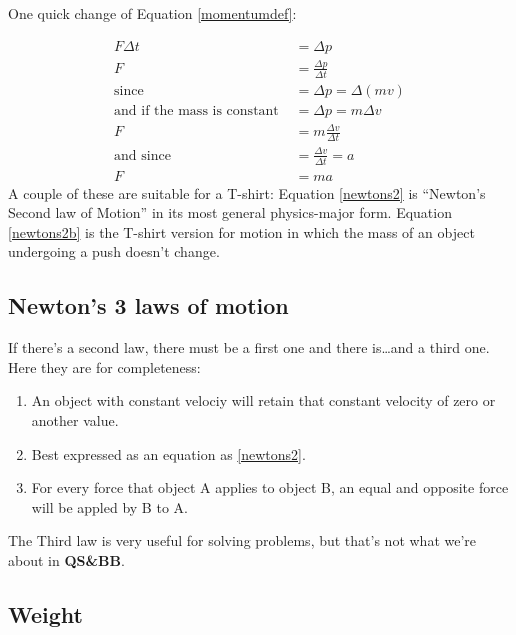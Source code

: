 \documentclass[
  letterpaper,
  DIV=11,
  numbers=noendperiod,
  oneside]{scrreprt}
\providecommand{\tightlist}{%
  \setlength{\itemsep}{0pt}\setlength{\parskip}{0pt}}\usepackage{longtable,booktabs,array}
\begin{document}
One quick change of Equation \eqref{momentumdef}:

\[
\begin{align}
F\Delta t &= \Delta p \nonumber \\
F &= \frac{\Delta p}{\Delta t} \label{newtons2} \\
\text{since }&=\Delta p = \Delta (mv) \nonumber \\
\text{and if the mass is constant } &= \Delta p =m\Delta v \nonumber\\
F &= m \frac{\Delta v}{\Delta t} \nonumber \\
\text{and since } &= \frac{\Delta v}{\Delta t} = a \nonumber \\
F &= ma \label{newtons2b}
\end{align}
\] A couple of these are suitable for a T-shirt: Equation
\eqref{newtons2} is ``Newton's Second law of Motion'' in its most
general physics-major form. Equation \eqref{newtons2b} is the T-shirt
version for motion in which the mass of an object undergoing a push
doesn't change.

\subsection{Newton's 3 laws of motion}\label{sec-newtonslaws}

If there's a second law, there must be a first one and there
is\ldots and a third one. Here they are for completeness:

\begin{enumerate}
\def\labelenumi{\arabic{enumi}.}
\tightlist
\item
  An object with constant velociy will retain that constant velocity of
  zero or another value.
\item
  Best expressed as an equation as \eqref{newtons2}.
\item
  For every force that object A applies to object B, an equal and
  opposite force will be appled by B to A.
\end{enumerate}

The Third law is very useful for solving problems, but that's not what
we're about in \textbf{QS\&BB}.

\subsection{Weight}\label{sec-weight}
\end{document}
